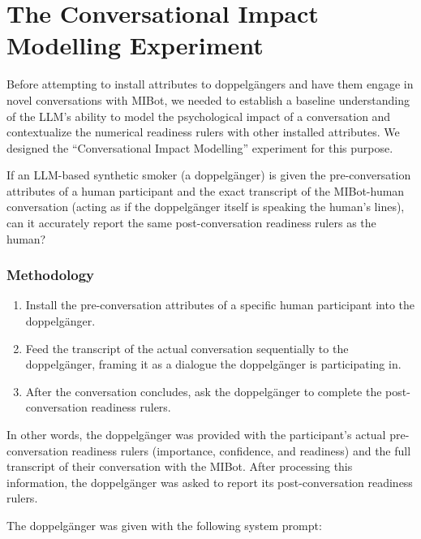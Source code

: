 \section{The Conversational Impact Modelling Experiment}
\label{sec:transcript-autoplay}
Before attempting to install attributes to doppelgängers and have them engage in novel conversations with MIBot, we needed to establish a baseline understanding of the LLM's ability to model the psychological impact of a conversation and contextualize the numerical readiness rulers with other installed attributes. We designed the ``Conversational Impact Modelling'' experiment for this purpose.

If an LLM-based synthetic smoker (a doppelgänger) is given the pre-conversation attributes of a human participant and the exact transcript of the MIBot-human conversation (acting as if the doppelgänger itself is speaking the human's lines), can it accurately report the same post-conversation readiness rulers as the human?

\subsubsection{Methodology}
\begin{enumerate}
\item Install the pre-conversation attributes of a specific human participant into the doppelgänger.
\item Feed the transcript of the actual conversation sequentially to the doppelgänger, framing it as a dialogue the doppelgänger is participating in.
\item After the conversation concludes, ask the doppelgänger to complete the post-conversation readiness rulers.
\end{enumerate}

In other words, the doppelgänger was provided with the participant's actual pre-conversation readiness rulers (importance, confidence, and readiness) and the full transcript of their conversation with the MIBot. After processing this information, the doppelgänger was asked to report its post-conversation readiness rulers.

The doppelgänger was given with the following system prompt:

